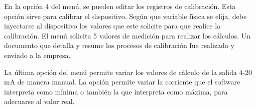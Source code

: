En la opción 4 del menú, se pueden editar los registros de calibración. Esta opción sirve para calibrar el dispositivo. Según que variable física se elija, debe inyectarse al dispositivo los valores que este solicite para que realice la calibración. El menú solicita 5 valores de medición para realizar los cálculos. Un documento que detalla y resume los procesos de calibración fue realizado y enviado a la empresa.

La última opción del menú  permite variar  los valores de cálculo de la salida 4-20 mA de manera manual. La opción permite variar la corriente que el software interpreta como mínima o también la que interpreta como máxima, para adecuarse al valor real.


